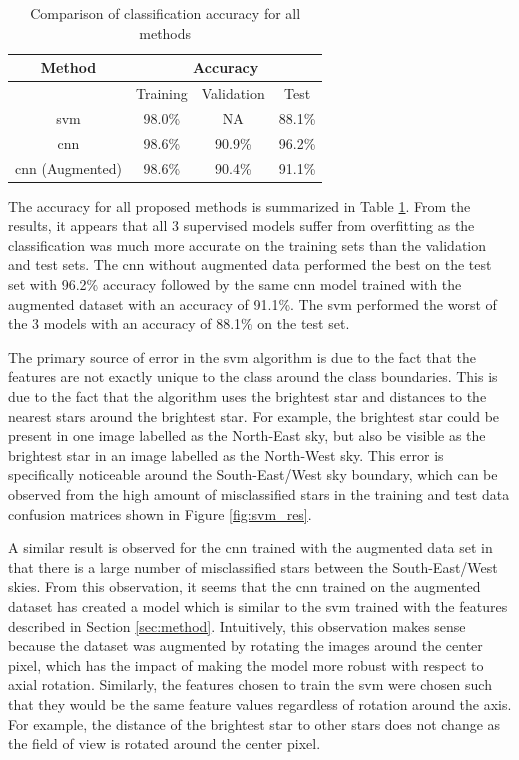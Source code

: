 \documentclass[10pt,twocolumn,letterpaper]{article}
\begin{document}
\begin{table}[H]
  \centering
  \begin{tabular}{*4c}
    \toprule
    Method & \multicolumn{3}{c}{Accuracy} \\
    \midrule
    {} & Training & Validation & Test \\
    \acrshort{svm} & 98.0\% & NA & 88.1\% \\
    \acrshort{cnn} & 98.6\% & 90.9\% & 96.2\% \\
    \acrshort{cnn} (Augmented) & 98.6\% & 90.4\% & 91.1\% \\
    \bottomrule
  \end{tabular}
  \caption{Comparison of classification accuracy for all methods}
  \label{tab:accuracy}
\end{table}

The accuracy for all proposed methods is summarized in Table \ref{tab:accuracy}. From the results, it appears that all 3 supervised models suffer from overfitting as the classification was much more accurate on the training sets than the validation and test sets. The \acrshort{cnn} without augmented data performed the best on the test set with 96.2\% accuracy followed by the same \acrshort{cnn} model trained with the augmented dataset with an accuracy of 91.1\%. The \acrshort{svm} performed the worst of the 3 models with an accuracy of 88.1\% on the test set.

The primary source of error in the \acrshort{svm} algorithm is due to the fact that the features are not exactly unique to the class around the class boundaries. This is due to the fact that the algorithm uses the brightest star and distances to the nearest stars around the brightest star. For example, the brightest star could be present in one image labelled as the North-East sky, but also be visible as the brightest star in an image labelled as the North-West sky. This error is specifically noticeable around the South-East/West sky boundary, which can be observed from the high amount of misclassified stars in the training and test data confusion matrices shown in Figure \ref{fig:svm_res}.

A similar result is observed for the \acrshort{cnn} trained with the augmented data set in that there is a large number of misclassified stars between the South-East/West skies. From this observation, it seems that the \acrshort{cnn} trained on the augmented dataset has created a model which is similar to the \acrshort{svm} trained with the features described in Section \ref{sec:method}. Intuitively, this observation makes sense because the dataset was augmented by rotating the images around the center pixel, which has the impact of making the model more robust with respect to axial rotation. Similarly, the features chosen to train the \acrshort{svm} were chosen such that they would be the same feature values regardless of rotation around the axis. For example, the distance of the brightest star to other stars does not change as the field of view is rotated around the center pixel.
\end{document}
